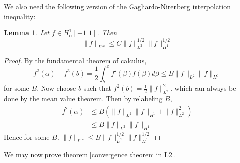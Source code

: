 \documentclass{article}[12pt]
\theoremstyle{Theorem}
\newtheorem{lemma}{Lemma}
\begin{document}
We also need the following version of the Gagliardo-Nirenberg interpolation inequality:
\begin{lemma}
    Let $f \in H^1_\alpha[-1,1]$. Then
    \begin{equation}
        \|f\|_{L^\infty} \leq C\|f\|_{L^2}^{1/2}\|f\|_{H^1}^{1/2}
    \end{equation}
    \label{gagliardo lemma}
\end{lemma}
\begin{proof}
    By the fundamental theorem of calculus,
    \begin{equation}
        f^2(\alpha) - f^2(b) = \frac{1}{2}\int_b^\alpha f'(\beta)f(\beta)d\beta \leq B\|f\|_{L^2}\|f\|_{H^1}
    \end{equation}
    for some $B$. Now choose $b$ such that $f^2(b) = \frac{1}{2}\|f\|_{L^2}^2$, which can always be done by the mean value theorem. Then by relabeling $B$,
    \begin{align}
        f^2(\alpha) &\leq B(\|f\|_{L^2}\|f\|_{H^1} +  \|f\|_{L^2}^2) \\ 
        &\leq B\|f\|_{L^2}\|f\|_{H^1} 
    \end{align}
    Hence for some $B$, $\|f\|_{L^\infty} \leq B\|f\|_{L^2}^{1/2}\|f\|_{H^1}^{1/2}$
    
\end{proof}

We may now prove theorem \ref{convergence theorem in L2}.
\end{document}
